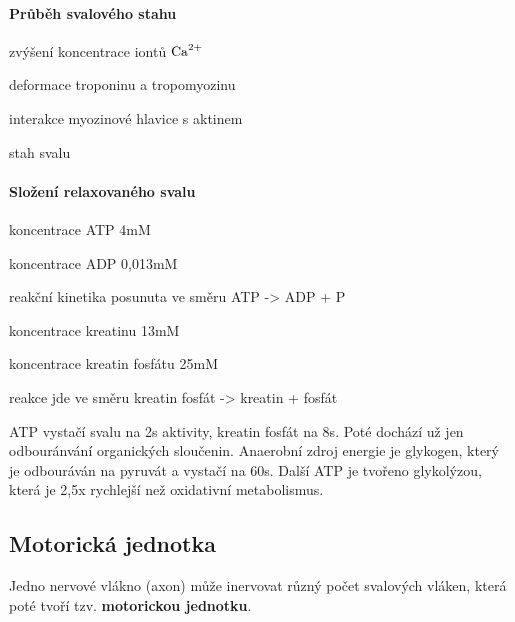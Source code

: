 \documentclass[DIV=8]{scrreprt}
\begin{document}
\paragraph{Průběh svalového stahu}
\begin{myEnumerate}[nosep]
    \item zvýšení koncentrace iontů \(\ce{Ca^{2+}}\)
    \item deformace troponinu a tropomyozinu
    \item interakce myozinové hlavice s aktinem
    \item stah svalu
\end{myEnumerate}



\paragraph{Složení relaxovaného svalu}
\begin{myItemize}[nosep]
    \item koncentrace ATP 4mM
    \item koncentrace ADP 0,013mM
    \item reakční kinetika posunuta ve směru ATP -> ADP + P
    \item koncentrace kreatinu 13mM
    \item koncentrace kreatin fosfátu 25mM
    \item reakce jde ve směru kreatin fosfát -> kreatin + fosfát
\end{myItemize}



ATP vystačí svalu na 2s aktivity, kreatin fosfát na 8s. Poté dochází už jen odbouránvání organických sloučenin. Anaerobní zdroj energie je glykogen, který je odbouráván na pyruvát a vystačí na 60s. Další ATP je tvořeno glykolýzou, která je 2,5x rychlejší než oxidativní metabolismus.

\subsection{Motorická jednotka} \label{Motorická jednotka}


Jedno nervové vlákno (axon) může inervovat různý počet svalových vláken, která poté tvoří tzv. \textbf{motorickou jednotku}.
\end{document}

